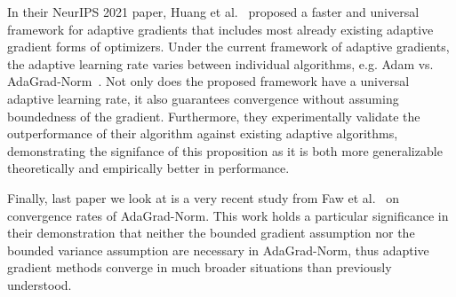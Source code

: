 \documentclass{article}
\begin{document}
In their NeurIPS 2021 paper, Huang et al.~\cite{https://doi.org/10.48550/arxiv.2106.08208} proposed a faster and universal framework for adaptive gradients that includes most already existing
adaptive gradient forms of optimizers. Under the current framework of adaptive gradients, the adaptive learning rate varies between individual algorithms,
e.g. Adam vs. AdaGrad-Norm~\cite{ward2018adagrad}. Not only does the proposed framework have a universal adaptive learning rate, it also guarantees
convergence without assuming boundedness of the gradient. Furthermore, they experimentally validate the outperformance of their algorithm against existing adaptive algorithms,
demonstrating the signifance of this proposition as it is both more generalizable theoretically and empirically better in performance.

Finally, last paper we look at is a very recent study from Faw et al.~\cite{https://doi.org/10.48550/arxiv.2202.05791} on convergence rates of AdaGrad-Norm\cite{ward2018adagrad}. This work holds a particular significance in their demonstration that
neither the bounded gradient assumption nor the bounded variance assumption are necessary in AdaGrad-Norm\cite{ward2018adagrad},
thus adaptive gradient methods converge in much broader situations than previously understood.

\medskip
\small


%
\end{document}
